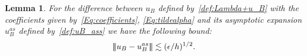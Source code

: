 \documentclass{article}
\newcommand{\vvvert}{\ensuremath|\!|\!|\xspace}
\newtheorem{lemma}[thm]{Lemma}
\newcommand{\uBas}{\ensuremath{u_B^{as}}\xspace}
\begin{document}

\begin{lemma}\label{Lemma:8}
For the difference between $u_B$ defined by~\eqref{def:Lambda+u_B} with the coefficients given by~\eqref{Eq:coefficients}, \eqref{Eq:tildealpha}  and its asymptotic expansion $\uBas$ defined by~\eqref{def:uB_ass} we have the following bound:
$$
\vvvert  u_B - \uBas \vvvert  \lesssim (\epsilon/h)^{1/2}.
$$
\end{lemma}
\end{document}

